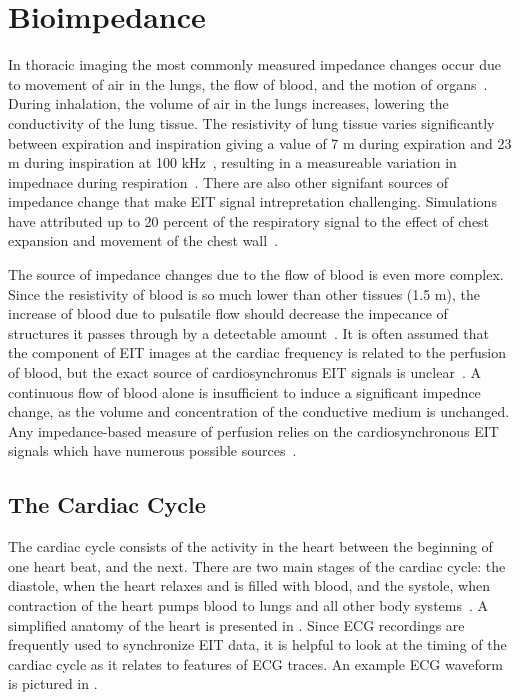 \section{Bioimpedance}
In thoracic imaging the most commonly measured 
impedance changes occur due to movement 
of air in the lungs, the flow of blood, and the motion of 
organs~\parencite{adler_electrical_2017}. 
During inhalation, the volume of air in the lungs increases, lowering the 
conductivity of the lung tissue. 
The resistivity of lung tissue varies significantly
between expiration and inspiration giving a value of 7 \Omega m during expiration
and 23 \Omega m during inspiration at 100 kHz~\parencite{witsoe_electrical_1967},
resulting in a
measureable variation in impednace during respiration~\parencite{eyuboglu_vivo_1989}. 
There are also other 
signifant sources of impedance change that make EIT signal intrepretation 
challenging. Simulations have attributed up to 20
percent of the respiratory signal to the effect of 
chest expansion and movement of the chest 
wall~\parencite{adler_impedance_1994}.

The source of impedance changes due to the flow of blood is even more complex. 
Since the resistivity of blood is so much lower than other tissues 
(1.5 \Omega m), the increase of blood due to pulsatile 
flow should decrease the impecance of structures it passes through 
by a detectable amount~\parencite{eyuboglu_vivo_1989}.
It is often assumed that the component of EIT images at the cardiac 
frequency is related to the perfusion of blood, but the exact source of
cardiosynchronus EIT signals is 
unclear~\parencite{patterson_impedance_2010,nguyen_review_2012}.
A continuous flow of blood alone is insufficient 
to induce a significant impednce change, 
as the volume and concentration of the conductive medium is unchanged. 
Any impedance-based measure of perfusion relies on the cardiosynchronous 
EIT signals which have numerous possible sources~\parencite{adler_origins_2017}. 

\subsection{The Cardiac Cycle}
The cardiac cycle consists of the activity in the heart between the
beginning of one heart beat, and the next. There are two main stages 
of the cardiac cycle: the diastole, when the heart relaxes and is filled 
with blood, and the systole, when contraction of the heart pumps blood to
lungs and all other body systems~\parencite{pappano_cardiovascular_2019}. 
A simplified anatomy of the heart is 
presented in . 
Since ECG recordings are frequently used to synchronize 
EIT data, it is helpful to look at the timing of the cardiac cycle as it 
relates to features of ECG traces. An example ECG waveform is pictured in 
. 

